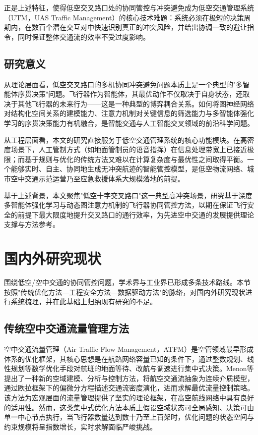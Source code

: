 \documentclass[12pt,a4paper,UTF8]{ctexbook}
\begin{document}
正是上述特征，使得低空交叉路口处的协同管控与冲突避免成为低空交通管理系统（UTM，UAS Traffic Management）的核心技术难题：系统必须在极短的决策周期内，在数百个潜在交互对中快速识别真正的冲突风险，并给出协调一致的避让指令，同时保证整体交通流的效率不受过度影响。

\subsection{研究意义}

从理论层面看，低空交叉路口的多机协同冲突避免问题本质上是一个典型的"多智能体序贯决策"问题。飞行器作为智能体，其最优动作不仅取决于自身状态，还取决于其他飞行器的未来行为——这是一种典型的博弈耦合关系。如何将图神经网络对结构化空间关系的建模能力、注意力机制对关键信息的筛选能力与多智能体强化学习的序贯决策能力有机融合，是智能交通与人工智能交叉领域的前沿科学问题。

从工程层面看，本文的研究直接服务于低空交通管理系统的核心功能模块。在高密度场景下，人工管制方式（如地面管制员的语音指挥）在信息处理带宽上已接近极限；而基于规则与优化的传统方法又难以在计算复杂度与最优性之间取得平衡。一个能够实时、自主、协同地生成无冲突航迹的智能管控模型，是低空物流网络、城市空中交通示范运营乃至应急救援体系大规模落地的前提。

基于上述背景，本文聚焦"低空十字交叉路口"这一典型高冲突场景，研究基于深度多智能体强化学习与动态图注意力机制的飞行器协同管控方法，以期在保证飞行安全的前提下最大限度地提升交叉路口的通行效率，为先进空中交通的发展提供理论支撑与方法参考。

\section{国内外研究现状}

围绕低空/空中交通的协同管控问题，学术界与工业界已形成多条技术路线。本节按照"传统优化方法—工程安全方法—数据驱动方法"的脉络，对国内外研究现状进行系统梳理，并在此基础上归纳现有研究的不足。

\subsection{传统空中交通流量管理方法}

空中交通流量管理（Air Traffic Flow Management，ATFM）是空管领域最早形成体系的优化框架，其核心思想是在航路网络容量已知的条件下，通过整数规划、线性规划等数学优化手段对航班的地面等待、改航与调速进行集中式决策。Menon等\cite{ref2}提出了一种新的空域建模、分析与控制方法，将航空交通流抽象为连续介质模型，通过欧拉框架下的偏微分方程描述交通流密度演化，进而求解最优流量控制策略。该方法为宏观层面的流量管理提供了坚实的理论框架，在高空航线网络中具有良好的适用性。然而，这类集中式优化方法本质上假设空域状态可全局感知、决策可由单一中心节点执行，当飞行器数量达到数十乃至上百架时，优化问题的状态空间与约束规模将呈指数增长，实时求解面临严峻挑战。
\end{document}
